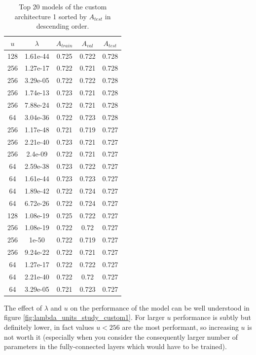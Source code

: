 \begin{table}[ht]
\centering
\begin{tabular}{ |c|c|c|c|c| }
\hline
$u$ & $\lambda$ & $A_{train}$ & $A_{val}$ & $A_{test}$ \\
\hline
128 & 1.61e-44 & 0.725 & 0.722 & 0.728 \\
256 & 1.27e-17 & 0.722 & 0.721 & 0.728 \\
256 & 3.29e-05 & 0.722 & 0.722 & 0.728 \\
256 & 1.74e-13 & 0.723 & 0.721 & 0.728 \\
256 & 7.88e-24 & 0.722 & 0.721 & 0.728 \\
64 & 3.04e-36 & 0.722 & 0.723 & 0.728 \\
256 & 1.17e-48 & 0.721 & 0.719 & 0.727 \\
256 & 2.21e-40 & 0.723 & 0.721 & 0.727 \\
256 & 2.4e-09 & 0.722 & 0.721 & 0.727 \\
64 & 2.59e-38 & 0.723 & 0.722 & 0.727 \\
64 & 1.61e-44 & 0.723 & 0.723 & 0.727 \\
64 & 1.89e-42 & 0.722 & 0.724 & 0.727 \\
64 & 6.72e-26 & 0.722 & 0.724 & 0.727 \\
128 & 1.08e-19 & 0.725 & 0.722 & 0.727 \\
256 & 1.08e-19 & 0.722 & 0.72 & 0.727 \\
256 & 1e-50 & 0.722 & 0.719 & 0.727 \\
256 & 9.24e-22 & 0.722 & 0.721 & 0.727 \\
64 & 1.27e-17 & 0.722 & 0.722 & 0.727 \\
64 & 2.21e-40 & 0.722 & 0.72 & 0.727 \\
64 & 3.29e-05 & 0.721 & 0.723 & 0.727 \\
\hline
\end{tabular}
\caption{Top 20 models of the custom architecture 1 sorted by $A_{test}$ in descending order.}
\label{table:top20_custom1}
\end{table}

The effect of $\lambda$ and $u$ on the performance of the model can be well understood in figure \ref{fig:lambda_units_study_custom1}. For larger $u$ performance is subtly but definitely lower, in fact values $u < 256$ are the most performant, so increasing $u$ is not worth it (especially when you consider the consequently larger number of parameters in the fully-connected layers which would have to be trained).

